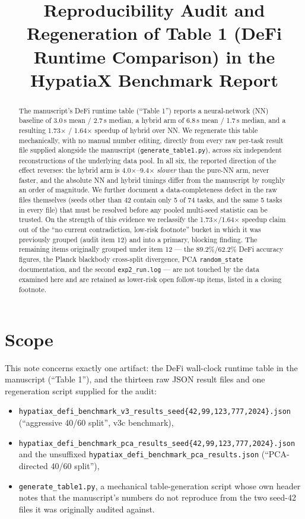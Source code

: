\documentclass{jmlr}
\title{Reproducibility Audit and Regeneration of Table 1 (DeFi Runtime
Comparison) in the HypatiaX Benchmark Report}
\author{\Name{HypatiaX Benchmark Reproducibility Audit}}
\begin{document}
\jmlrmaketitle

\begin{abstract}
The manuscript's DeFi runtime table (``Table 1'') reports a neural-network
(NN) baseline of 3.0\,s mean / 2.7\,s median, a hybrid arm of 6.8\,s mean /
1.7\,s median, and a resulting 1.73$\times$ / 1.64$\times$ speedup of hybrid
over NN. We regenerate this table mechanically, with no manual number
editing, directly from every raw per-task result file supplied alongside
the manuscript (\texttt{generate\_table1.py}), across six independent
reconstructions of the underlying data pool. In all six, the reported
direction of the effect reverses: the hybrid arm is 4.0$\times$--9.4$\times$
\emph{slower} than the pure-NN arm, never faster, and the absolute NN and
hybrid timings differ from the manuscript by roughly an order of magnitude.
We further document a data-completeness defect in the raw files themselves
(seeds other than 42 contain only 5 of 74 tasks, and the same 5 tasks in
every file) that must be resolved before any pooled multi-seed statistic
can be trusted. On the strength of this evidence we reclassify the
1.73$\times$/1.64$\times$ speedup claim out of the ``no current
contradiction, low-risk footnote'' bucket in which it was previously
grouped (audit item 12) and into a primary, blocking finding. The remaining
items originally grouped under item 12 --- the 89.2\%/62.2\% DeFi accuracy
figures, the Planck blackbody cross-split divergence, PCA
\texttt{random\_state} documentation, and the second \texttt{exp2\_run.log}
--- are not touched by the data examined here and are retained as
lower-risk open follow-up items, listed in a closing footnote.
\end{abstract}

\section{Scope}

This note concerns exactly one artifact: the DeFi wall-clock runtime table
in the manuscript (``Table 1''), and the thirteen raw JSON result files and
one regeneration script supplied for the audit:

\begin{itemize}
\item \texttt{hypatiax\_defi\_benchmark\_v3\_results\_seed\{42,99,123,777,2024\}.json}
  (``aggressive 40/60 split'', v3c benchmark),
\item \texttt{hypatiax\_defi\_benchmark\_pca\_results\_seed\{42,99,123,777,2024\}.json}
  and the unsuffixed \texttt{hypatiax\_defi\_benchmark\_pca\_results.json}
  (``PCA-directed 40/60 split''),
\item \texttt{generate\_table1.py}, a mechanical table-generation script
  whose own header notes that the manuscript's numbers do not reproduce
  from the two seed-42 files it was originally audited against.
\end{itemize}
\end{document}
